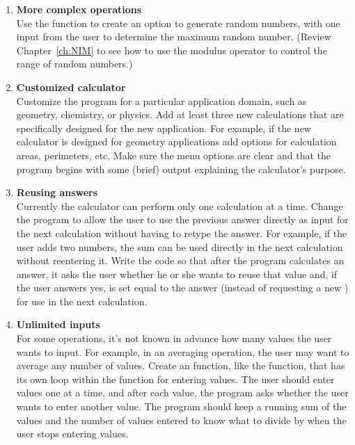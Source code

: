 \begin{enumerate}[{\bf 1.}]
\item {\bf More complex operations} \\
Use the  function to create an option to generate random numbers, with one input from the user to determine the maximum random number.  (Review Chapter~\ref{ch:NIM} to see how to use the modulus operator to control the range of random numbers.)  

\item {\bf Customized calculator} \\
Customize the program for a particular application domain, such as geometry, chemistry, or physics.  Add at least three new calculations that are specifically designed for the new application.  For example, if the new calculator is designed for geometry applications add options for calculation areas, perimeters, etc.  Make sure the menu options are clear and that the program begins with some (brief) output explaining the calculator's purpose.
  
\item {\bf Reusing answers}\\
 Currently the calculator can perform only one calculation at a time.  Change the program to allow the user to use the previous answer directly as input for the next calculation without having to retype the answer.  For example, if the user adds two numbers, the sum can be used directly in the next calculation without reentering it.   Write the code so that after the program calculates an answer, it asks the user whether he or she wants to reuse that value and, if the user answers yes,  is set equal to the answer (instead of requesting a new ) for use in the next calculation.  

\item {\bf Unlimited inputs}\\
 For some operations, it's not known in advance how many values the user wants to input.  For example, in an averaging operation, the user may want to average any number of values.  Create an  function, like the  function, that has its own loop within the function for entering values.  The user should enter values one at a time, and after each value, the program asks whether the user wants to enter another value.  The program should keep a running sum of the values and the number of values entered to know what to divide by when the user stops entering values.


\end{enumerate}
